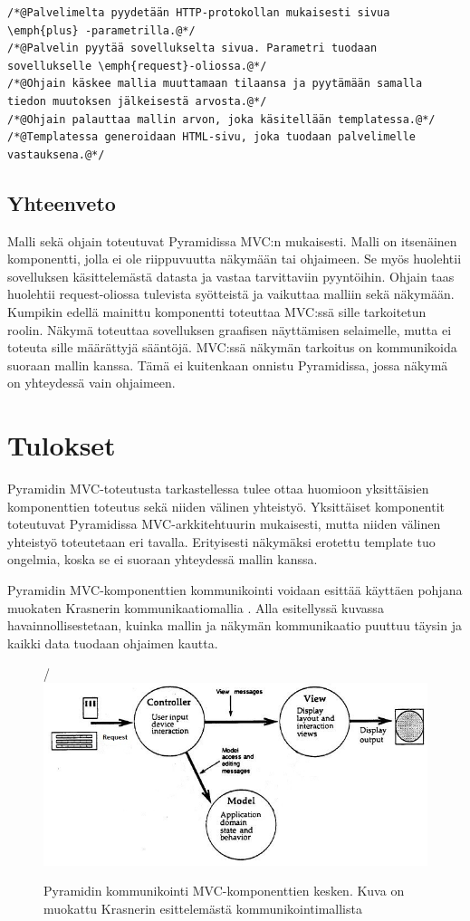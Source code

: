 \documentclass[finnish,utf8,nonumbib,palatino,kandi]{gradu2}
\begin{document}
\begin{lstlisting}
/*@Palvelimelta pyydetään HTTP-protokollan mukaisesti sivua \emph{plus} -parametrilla.@*/
/*@Palvelin pyytää sovellukselta sivua. Parametri tuodaan sovellukselle \emph{request}-oliossa.@*/
/*@Ohjain käskee mallia muuttamaan tilaansa ja pyytämään samalla tiedon muutoksen jälkeisestä arvosta.@*/
/*@Ohjain palauttaa mallin arvon, joka käsitellään templatessa.@*/
/*@Templatessa generoidaan HTML-sivu, joka tuodaan palvelimelle vastauksena.@*/
\end{lstlisting}

\subsection{Yhteenveto}
Malli sekä ohjain toteutuvat Pyramidissa MVC:n mukaisesti. Malli on itsenäinen komponentti, jolla ei ole riippuvuutta näkymään tai ohjaimeen. Se myös huolehtii sovelluksen käsittelemästä datasta ja vastaa tarvittaviin pyyntöihin. Ohjain taas huolehtii request-oliossa tulevista syötteistä ja vaikuttaa malliin sekä näkymään.  Kumpikin edellä mainittu komponentti toteuttaa MVC:ssä sille tarkoitetun roolin. Näkymä toteuttaa sovelluksen graafisen näyttämisen selaimelle, mutta ei toteuta sille määrättyjä sääntöjä. MVC:ssä näkymän tarkoitus on kommunikoida suoraan mallin kanssa. Tämä ei kuitenkaan onnistu Pyramidissa, jossa näkymä on yhteydessä vain ohjaimeen.

\section{Tulokset}
Pyramidin MVC-toteutusta tarkastellessa tulee ottaa huomioon yksittäisien komponenttien toteutus sekä niiden välinen yhteistyö. Yksittäiset komponentit toteutuvat Pyramidissa MVC-arkkitehtuurin mukaisesti, mutta niiden välinen yhteistyö
toteutetaan eri tavalla. Erityisesti näkymäksi erotettu template tuo ongelmia, koska se ei suoraan yhteydessä mallin kanssa. 

Pyramidin MVC-komponenttien kommunikointi voidaan esittää käyttäen pohjana muokaten Krasnerin kommunikaatiomallia \cite{Krasner:desc}.
Alla esitellyssä kuvassa havainnollisestetaan, kuinka mallin ja näkymän kommunikaatio puuttuu täysin ja kaikki data tuodaan ohjaimen kautta.

\begin{figure}[h]
\centering/
\includegraphics[scale=0.85]{pyramid_mvc.jpg}
\caption{Pyramidin kommunikointi MVC-komponenttien kesken. Kuva on muokattu Krasnerin esittelemästä kommunikointimallista \cite{Krasner:desc}  }
\end{figure}
\end{document}
